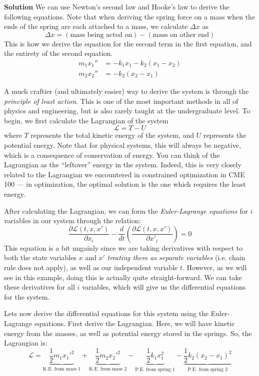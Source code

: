 \documentclass[letterpaper, fontsize=10pt]{scrartcl} %
\numberwithin{equation}{section} %
\numberwithin{figure}{section} %
\numberwithin{table}{section} %
\begin{document}
\begin{enumerate}
\par \textbf{Solution} We can use Newton's second law and Hooke's law to derive the following equations. Note that when deriving the spring force on a mass when the ends of the spring are each attached to a mass, we calculate $\Delta x$ as 
\[ \Delta x = (\text{mass being acted on}) - (\text{mass on other end})\]
This is how we derive the equation for the second term in the first equation, and the entirety of the second equation. 
\begin{align*}
m_1x_1'' &= -k_1x_1 -k_2(x_1 - x_2) \\
m_2x_2'' &= -k_2 (x_2 - x_1) 
\end{align*}
\par A much craftier (and ultimately easier) way to derive the system is through the \textit{principle of least action}. This is one of the most important methods in all of physics and engineering, but is also rarely taught at the undergraduate level. To begin, we first calculate the Lagrangian of the system 
\[ \mathcal{L} = T - U \]
where $T$ represents the total kinetic energy of the system, and $U$ represents the potential energy. Note that for physical systems, this will always be negative, which is a consequence of conservation of energy. You can think of the Lagrangian as the ``leftover'' energy in the system. Indeed, this is very closely related to the Lagrangian we encountered in constrained optimization in CME 100 --- in optimization, the optimal solution is the one which requires the least energy. 
\par After calculating the Lagrangian, we can form the \textit{Euler-Lagrange equations} for $i$ variables in our system through the relation:
\[ \frac{\partial \mathcal{L}(t,x,x') }{\partial x_i} - \frac{d}{dt} \left( \frac{\partial  \mathcal{L}(t,x,x') }{\partial x'_i}\right) = 0\]
This equation is a bit ungainly since we are taking derivatives with respect to both the state variables $x$ and $x'$ \textit{treating them as separate variables} (i.e. chain rule does not apply), as well as our independent variable $t$. However, as we will see in this example, doing this is actually quite straight-forward. We can take these derivatives for all $i$ variables, which will give us the differential equations for the system.

\par Lets now derive the differential equations for this system using the Euler-Lagrange equations. First derive the Lagrangian. Here, we will have kinetic energy from the masses, as well as potential energy stored in the springs. So, the Lagrangian is:
\[ \mathcal{L} = \underbrace{\frac{1}{2} m_1 x_1'^2}_{\text{K.E. from mass 1}} + \underbrace{\frac{1}{2} m_2 x_2'^2}_{\text{K.E. from mass 2}} - \underbrace{\frac{1}{2} k_1 x_1^2}_{\text{P.E. from spring 1}} - \underbrace{\frac{1}{2} k_2 (x_2 - x_1)^2}_{\text{P.E. from spring 2}} \]


\end{enumerate}
\end{document}
